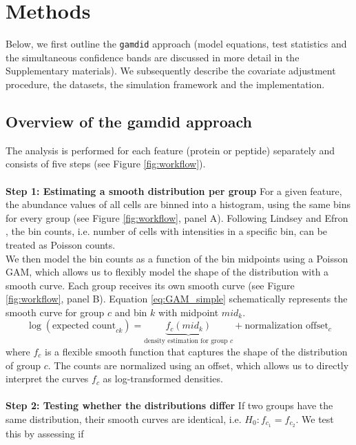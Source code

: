 \section{Methods} \label{methods}
{Below, we first outline the \texttt{gamdid} approach (model equations,
test statistics and the simultaneous confidence bands are discussed in
more detail in the Supplementary materials).
We subsequently describe the covariate adjustment procedure, the datasets,
the simulation framework and the implementation.

\subsection{Overview of the gamdid approach}

The analysis is performed for each feature (protein or peptide) separately and
consists of five steps (see Figure \ref{fig:workflow}).
\\
\\
\textbf{Step 1: Estimating a smooth distribution per group}
For a given feature, the abundance values of all cells are binned into a histogram,
using the same bins for every group (see Figure \ref{fig:workflow}, panel A).
Following Lindsey \cite{lindsay_method} and Efron \cite{efron}, the bin counts,
i.e. number of cells with intensities in a specific bin,
can be treated as Poisson counts.
\\
We then model the bin counts as a function of the bin midpoints using a
Poisson GAM, which allows us to flexibly model the
shape of the distribution with a smooth curve. Each group receives its own
smooth curve (see Figure \ref{fig:workflow}, panel B).
Equation \ref{eq:GAM_simple} schematically represents the smooth curve for group $c$
and bin $k$ with midpoint $mid_k$.
\begin{equation}
    \log(\text{expected count}_{ck}) = \underbrace{f_c(mid_k)}_{\text{density estimation for group } c} + \text{normalization offset}_c
    \label{eq:GAM_simple}
\end{equation}
where $f_c$ is a flexible smooth function that captures the shape of the distribution of group $c$.
The counts are normalized using an offset, which allows us to directly interpret the curves $f_c$
as log-transformed densities.
\\
\\
\textbf{Step 2: Testing whether the distributions differ}
If two groups have the same distribution, their smooth curves are identical,
i.e. $H_0: f_{c_1} = f_{c_2}$. We test this by assessing if
}
